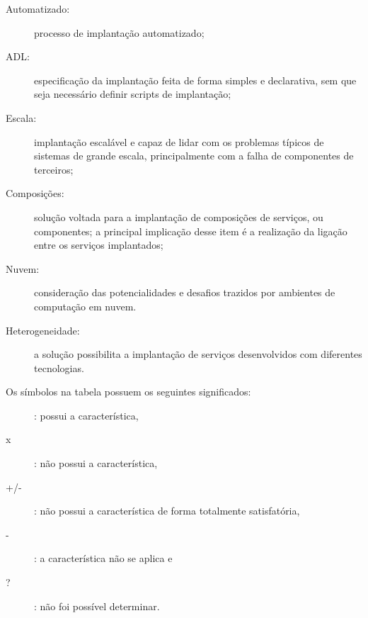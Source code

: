 \begin{description}
\item [Automatizado:] processo de implantação automatizado;
\item [ADL:] especificação da implantação feita de forma simples e declarativa, sem que seja necessário definir scripts de implantação;
\item [Escala:] implantação escalável e capaz de lidar com os problemas típicos de sistemas de grande escala, principalmente com a falha de componentes de terceiros;
\item [Composições:] solução voltada para a implantação de composições de serviços, ou componentes; a principal implicação desse item é a realização da ligação entre os serviços implantados;
\item [Nuvem:] consideração das potencialidades e desafios trazidos por ambientes de computação em nuvem.
\item [Heterogeneidade:] a solução possibilita a implantação de serviços desenvolvidos com diferentes tecnologias.
\end{description}

Os símbolos na tabela possuem os seguintes significados: 

\begin{description}
\item [\checkmark{}]: possui a característica, 
\item [x]: não possui a característica, 
\item [+/-]: não possui a característica de forma totalmente satisfatória, 
\item [-]: a característica não se aplica e 
\item [?]: não foi possível determinar. 
\end{description}

